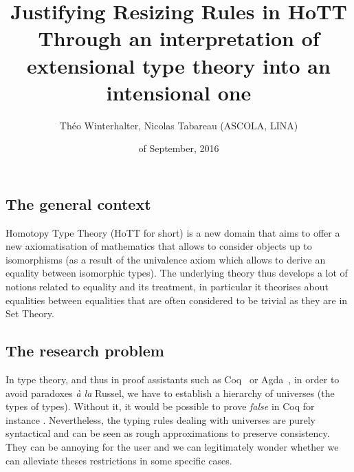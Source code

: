 \documentclass[11pt]{article}
\theoremstyle{plain}
\theoremstyle{remark}
\begin{document}
\title{Justifying Resizing Rules in HoTT \\
\small{Through an interpretation of extensional type theory into an intensional
one}}

\author{Théo Winterhalter, Nicolas Tabareau (ASCOLA, LINA)}

\date{ of September, 2016}

\maketitle

\pagestyle{empty} %
\thispagestyle{empty}



\subsection*{The general context}
Homotopy Type Theory (HoTT for short) is a new domain that aims to offer a new
axiomatisation of mathematics that allows to consider objects up to isomorphisms
(as a result of the univalence axiom which allows to derive an equality between
isomorphic types).
The underlying theory thus develops a lot of notions related to equality and its
treatment, in particular it theorises about equalities between equalities that
are often considered to be trivial as they are in Set Theory.

\subsection*{The research problem}

In type theory, and thus in proof assistants such as Coq~\cite{coq:manual} or
Agda~\cite{norell2007towards}, in order to avoid paradoxes \emph{à la} Russel,
we have to establish a hierarchy of universes (the types of types). Without it,
it would be possible to prove \emph{false} in Coq for instance
\cite{coquand:typetype}.
Nevertheless, the typing rules dealing with universes are purely syntactical
and can be seen as rough approximations to preserve consistency.
They can be annoying for the user and we can legitimately wonder whether we
can alleviate theses restrictions in some specific cases.
\end{document}
